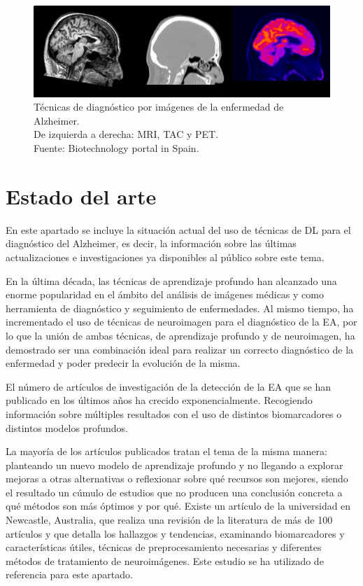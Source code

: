 \begin{figure}[H]
    \centering
    \includegraphics[width=\textwidth]{./imgs/MRI-TAC-PET}
    \caption{Técnicas de diagnóstico por imágenes de la enfermedad de Alzheimer.\\ De izquierda a derecha: MRI, TAC y PET.
    \\Fuente: Biotechnology portal in Spain.}
    \label{fig:tecnicas-diagnosico-imagen}
\end{figure}

\section{Estado del arte}\label{sec:estado-del-arte}
En este apartado se incluye la situación actual del uso de técnicas de DL para el diagnóstico del Alzheimer, es decir,
la información sobre las últimas actualizaciones e investigaciones ya disponibles al público sobre este tema.

En la última década, las técnicas de aprendizaje profundo han alcanzado una enorme popularidad en el ámbito del análisis
de imágenes médicas y como herramienta de diagnóstico y seguimiento de enfermedades.
Al mismo tiempo, ha incrementado el uso de técnicas de neuroimagen para el diagnóstico de la EA, por lo que la unión de
ambas técnicas, de aprendizaje profundo y de neuroimagen, ha demostrado ser una combinación ideal para realizar un
correcto diagnóstico de la enfermedad y poder predecir la evolución de la misma.

El número de artículos de investigación de la detección de la EA que se han publicado en los últimos años ha crecido
exponencialmente.
Recogiendo información sobre múltiples resultados con el uso de distintos biomarcadores o distintos modelos profundos.

La mayoría de los artículos publicados tratan el tema de la misma manera: planteando un nuevo modelo de aprendizaje
profundo y no llegando a explorar mejoras a otras alternativas o reflexionar sobre qué recursos son mejores, siendo el
resultado un cúmulo de estudios que no producen una conclusión concreta a qué métodos son más óptimos y por qué.
Existe un artículo de la universidad en Newcastle, Australia, que realiza una revisión de la literatura de más de 100
artículos y que detalla los hallazgos y tendencias, examinando biomarcadores y características útiles, técnicas de
preprocesamiento necesarias y diferentes métodos de tratamiento de neuroimágenes.
Este estudio se ha utilizado de referencia para este apartado.

